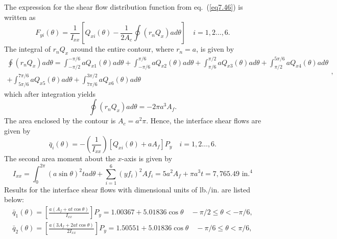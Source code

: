 \documentclass{AeroStructure-ERJohnson}
\begin{document}
\begin{example}
The expression for the shear flow distribution function from eq.~(\ref{eq7.46}) is written as
\begin{equation}
F_{y i}(\theta)=\frac{1}{I_{x x}}\left[Q_{x i}(\theta)-\frac{1}{2 A_{c}} \oint\left(r_{n} Q_{x}\right) a d \theta\right] \quad i=1,2 \ldots, 6. \label{eq7.6.g}\tag{g}
\end{equation}
The integral of $r_{n} Q_{x}$ around the entire contour, where $r_{n}=a$, is given by
\begin{equation}
\begin{gathered}\oint\left(r_{n} Q_{x}\right) a d \theta=\int_{-\pi / 2}^{-\pi / 6} a Q_{x 1}(\theta) a d \theta+\int_{-\pi / 6}^{\pi / 6} a Q_{x 2}(\theta) a d \theta+\int_{\pi / 6}^{\pi / 2} a Q_{x 3}(\theta) a d \theta+\int_{\pi / 2}^{5\pi / 6} a Q_{x 4}(\theta) a d \theta \\
+ \int_{5 \pi / 6}^{7 \pi / 6} a Q_{x 5} (\theta) a d \theta+\int_{7 \pi / 6}^{3\pi / 2} a Q_{x 6}(\theta) a d \theta\end{gathered}, \label{eq7.6.h}\tag{h}
\end{equation}
which after integration yields
\begin{equation}
\oint\left(r_{n} Q_{x}\right) a d \theta=-2 \pi a^{3} A_{f}. \label{eq7.6.i}\tag{i}
\end{equation}
The area enclosed by the contour is $A_{c}=a^{2} \pi$. Hence, the interface shear flows are given by
\begin{equation}
\bar{q}_{i}(\theta)=-\left(\frac{1}{I_{x x}}\right)\left[Q_{x i}(\theta)+a A_{f}\right] P_{y} \quad i=1,2 \ldots, 6. \label{eq7.6.j}\tag{j}
\end{equation}
The second area moment about the $x$-axis is given by
\begin{equation}
I_{x x}=\int_{0}^{2 \pi}(a \sin \theta)^{2} t a d \theta+\sum_{i=1}^{6}\left(y f_{i}\right)^{2} A f_{i}=5 a^{2} A_{f}+\pi a^{3} t=7,765.49 \textrm{ in.}^{4}\label{eq7.6.k}\tag{k}
\end{equation}
Results for the interface shear flows with dimensional units of lb./in. are listed below:
\begin{gather}
\bar{q}_{1}(\theta)=\left[\frac{a(A_{f}+a t \cos \theta)}{I_{x x}}\right] P_{y}=1.00367+5.01836 \cos \theta \quad-\pi / 2 \leq \theta<-\pi / 6, \label{eq7.6.l}\tag{l} \\[3pt]
\bar{q}_{2}(\theta)=\left[\frac{a(3 A_{f}+2 a t \cos \theta)}{2 I_{x x}}\right] P_{y}=1.50551+5.01836 \cos \theta \quad-\pi / 6 \leq \theta<\pi / 6, \label{eq7.6.m}\tag{m} \\[3pt]

\end{gather}
\end{example}
\end{document}
